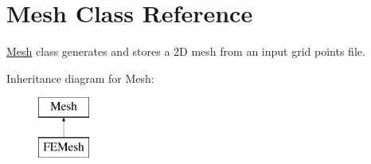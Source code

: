 \hypertarget{class_mesh}{}\section{Mesh Class Reference}
\label{class_mesh}


\mbox{\hyperlink{class_mesh}{Mesh}} class generates and stores a 2D mesh from an input grid points file.  


Inheritance diagram for Mesh\+:\begin{figure}[H]
\begin{center}
\leavevmode
\includegraphics[height=2.000000cm]{class_mesh}
\end{center}
\end{figure}
